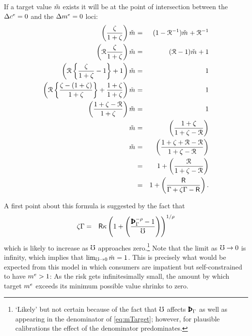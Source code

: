 \documentclass{handout}
\begin{document}
If a target value $\check{m}$ exists it will be at the point of intersection between the $\Delta c^{e}=0$ and the $\Delta m^{e}=0$ loci:
\begin{eqnarray}
  \left(\frac{\zeta}{1+\zeta}\right)\mTarg^{\null} & = & (1-\Rnorm^{-1})\mTarg^{\null}+\Rnorm^{-1}
\\  \left(\Rnorm\frac{\zeta}{1+\zeta}\right)\mTarg^{\null} & = & (\Rnorm-1)\mTarg^{\null}+1
\\  \left(\Rnorm\left\{\frac{\zeta}{1+\zeta}-1\right\}+1\right)\mTarg^{\null} & = & 1
\\  \left(\Rnorm\left\{\frac{\zeta-(1+\zeta)}{1+\zeta}\right\}+\frac{1+\zeta}{1+\zeta}\right)\mTarg^{\null} & = & 1
\\  \left(\frac{1+\zeta-\Rnorm}{1+\zeta}\right)\mTarg^{\null} & = & 1
\\  \mTarg^{\null} & = & \left(\frac{1+\zeta}{1+\zeta-\Rnorm}\right)
\\  \mTarg^{\null} & = & \left(\frac{1+\zeta+\Rnorm-\Rnorm}{1+\zeta-\Rnorm}\right)
\\ & = & 1 + \left(\frac{\Rnorm}{1+\zeta-\Rnorm}\right)
\\ & = & 1 + \left(\frac{\Rfree}{\PGro+\zeta\PGro-\Rfree}\right)  \label{eq:mTarget}
.
\end{eqnarray}

A first point about this formula is suggested by the fact that
\begin{eqnarray}
  \zeta\PGro & = & \Rfree \MPCU \left(1+\left(\frac{\PatPGro^{-\CRRA} - 1}{\urate}\right)\right)^{1/\CRRA}
\end{eqnarray}
which is likely to increase as $\mho$ approaches zero.\footnote{`Likely' but not certain because of the fact that $\mho$ affects $\PatPGro$ as well as
  appearing in the denominator of \eqref{eq:mTarget}; however, for
  plausible calibrations the effect of the denominator predominates.}
Note that the limit as $\mho \rightarrow 0$ is infinity, which
implies that $\lim_{\urate \rightarrow
  0} \mTarg^{\null} = 1$.  This is precisely what would be expected from
this model in which consumers are impatient but self-constrained to
have $m^{e} > 1$:  As the risk gets infinitesimally small, the
amount by which target $m^{e}$ exceeds its minimum possible value shrinks to
zero.
\end{document}
